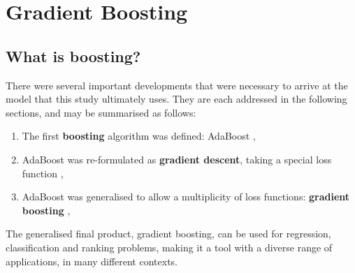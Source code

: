 \documentclass{article}
\begin{document}
\pagebreak

\pagebreak

\section{Gradient Boosting \label{chapter-gradient-boosting}}
\label{sec-5}


\subsection{What is boosting? \label{AdaBoost}}
\label{sec-5-1}

There were several important developments that were necessary to arrive at the model that this study ultimately uses. They are each addressed in the following sections, and may be summarised as follows:

\begin{enumerate}
\item The first \textbf{boosting} algorithm was defined: AdaBoost \cite{freund1996experiments}, \cite{Freund1997119}
\item AdaBoost was re-formulated as \textbf{gradient descent}, taking a special loss function \cite{Breiman97arcingthe}, \cite{breiman1998arcing}
\item AdaBoost was generalised to allow a multiplicity of loss functions: \textbf{gradient boosting} \cite{friedman2001greedy}, \cite{friedman2000additive}
\end{enumerate}

The generalised final product, gradient boosting, can be used for regression, classification and ranking problems, making it a tool with a diverse range of applications, in many different contexts.
\end{document}
